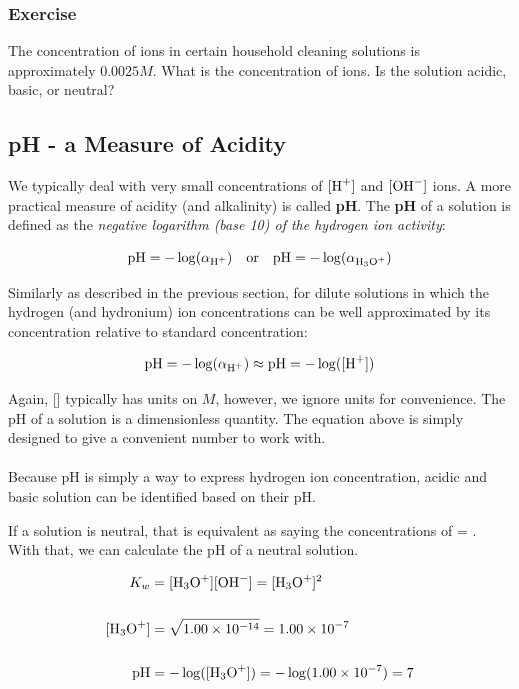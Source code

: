 \documentclass[12pt]{article}
\begin{document}
\subsubsection{Exercise}

The concentration of  ions in certain household cleaning solutions is approximately $0.0025 M$. What is the concentration of  ions. Is the solution acidic, basic, or neutral?

\newpage

\subsection{pH - a Measure of Acidity}

We typically deal with very small concentrations of $[\ce{H+}]$ and $[\ce{OH-}]$ ions. A more practical measure of acidity (and alkalinity) is called \textbf{pH}. The \textbf{pH} of a solution is defined as the \textit{negative logarithm (base 10) of the hydrogen ion activity}:

\begin{equation}
\text{pH} = -\log(\alpha_{\ce{H+}}) \quad \text{or} \quad  \text{pH} = -\log(\alpha_{\ce{H3O+}})
\end{equation}

\noindent Similarly as described in the previous section, for dilute solutions in which the hydrogen (and hydronium) ion concentrations can be well approximated by its concentration relative to standard concentration:

\begin{equation}
    \text{pH} = -\log(\alpha_{\ce{H+}}) \approx \text{pH} = -\log([\ce{H+}])
\end{equation}

\noindent Again, [] typically has units on $M$, however, we ignore units for convenience. The pH of a solution is a dimensionless quantity. The equation above is simply designed to give a convenient number to work with.
\\
\\
\noindent Because pH is simply a way to express hydrogen ion concentration, acidic and basic solution can be identified based on their pH.

\noindent If a solution is neutral, that is equivalent as saying the concentrations of  = . With that, we can calculate the pH of a neutral solution.

\begin{align*}
    K_{w} &= [\ce{H3O+}][\ce{OH-}] = [\ce{H3O+}]^{2} \\
    \\
    [\ce{H3O+}] &= \sqrt{1.00 \times 10^{-14}} = 1.00 \times 10^{-7} \\
    \\
    \text{pH} &= -\log([\ce{H3O+}]) = -\log(1.00\times10^{-7}) = 7\\
\end{align*}
\end{document}
